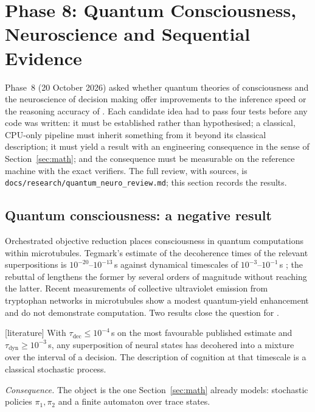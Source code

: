 \section{Phase 8: Quantum Consciousness, Neuroscience and Sequential Evidence}
\label{sec:phase8}

Phase~8 (20 October 2026) asked whether quantum theories of consciousness and the
neuroscience of decision making offer improvements to the inference speed or the
reasoning accuracy of \Sys. Each candidate idea had to pass four tests before any
code was written: it must be established rather than hypothesised; a classical,
CPU-only pipeline must inherit something from it beyond its classical description;
it must yield a result with an engineering consequence in the sense of
Section~\ref{sec:math}; and the consequence must be measurable on the reference
machine with the exact verifiers. The full review, with sources, is
\texttt{docs/research/quantum\_neuro\_review.md}; this section records the results.

\subsection{Quantum consciousness: a negative result}

Orchestrated objective reduction \cite{hameroff2014orchor} places consciousness
in quantum computations within microtubules. Tegmark's estimate of the
decoherence times of the relevant superpositions is $10^{-20}$--$10^{-13}$\,s
against dynamical timescales of $10^{-3}$--$10^{-1}$\,s \cite{tegmark2000decoherence};
the rebuttal of \cite{hagan2002quantum} lengthens the former by several orders of
magnitude without reaching the latter. Recent measurements of collective
ultraviolet emission from tryptophan networks in microtubules
\cite{babcock2024superradiance} show a modest quantum-yield enhancement and do
not demonstrate computation. Two results close the question for \Sys.

\begin{proposition} \textnormal{[literature]}
\label{prop:q1}
With $\tau_{\mathrm{dec}}\le10^{-4}$\,s on the most favourable published estimate and
$\tau_{\mathrm{dyn}}\ge10^{-3}$\,s, any superposition of neural states has decohered into a
mixture over the interval of a decision. The description of cognition at that
timescale is a classical stochastic process.
\end{proposition}
\emph{Consequence.} The object is the one Section~\ref{sec:math} already models:
stochastic policies $\pi_1,\pi_2$ and a finite automaton over trace states.

